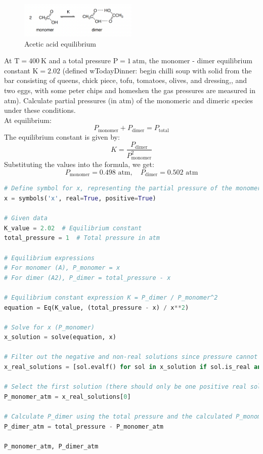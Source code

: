 \documentclass[12 pt]{article}
\begin{document}
\begin{figure}[h]
  \centering
  \includegraphics[width=0.5\textwidth]{image.png}
  \caption{Acetic acid equilibrium}
\end{figure}

At $\mathrm{T}=400 \mathrm{~K}$ and a total pressure $\mathrm{P}=1 \mathrm{~atm}$, the monomer - dimer equilibrium constant $\mathrm{K}=2.02$ (defined wTodayDinner: begin chilli soup with solid from the bar consisting of queens, chick piece, tofu, tomatoes, olives, and dressing,, and two eggs, with some peter chips and homeshen the gas pressures are measured in atm). Calculate partial pressures (in atm) of the monomeric and dimeric species under these conditions.\\
At equilibrium:
\begin{equation}
  P_{\text{monomer}} + P_{\text{dimer}} = P_{\text{total}}
\end{equation}
The equilibrium constant is given by:
\begin{equation}
  K = \frac{P_{\text{dimer}}}{P_{\text{monomer}}^2}
\end{equation}
Substituting the values into the formula, we get:
\begin{equation}
  P_{\text{monomer}} = 0.498 \text{ atm}, \quad P_{\text{dimer}} = 0.502 \text{ atm}
\end{equation}
\begin{lstlisting}[language=Python]
# Define symbol for x, representing the partial pressure of the monomer
x = symbols('x', real=True, positive=True)

# Given data
K_value = 2.02  # Equilibrium constant
total_pressure = 1  # Total pressure in atm

# Equilibrium expressions
# For monomer (A), P_monomer = x
# For dimer (A2), P_dimer = total_pressure - x

# Equilibrium constant expression K = P_dimer / P_monomer^2
equation = Eq(K_value, (total_pressure - x) / x**2)

# Solve for x (P_monomer)
x_solution = solve(equation, x)

# Filter out the negative and non-real solutions since pressure cannot be negative or non-real
x_real_solutions = [sol.evalf() for sol in x_solution if sol.is_real and sol > 0]

# Select the first solution (there should only be one positive real solution in this physical context)
P_monomer_atm = x_real_solutions[0]

# Calculate P_dimer using the total pressure and the calculated P_monomer
P_dimer_atm = total_pressure - P_monomer_atm

P_monomer_atm, P_dimer_atm

\end{lstlisting}
\end{document}
